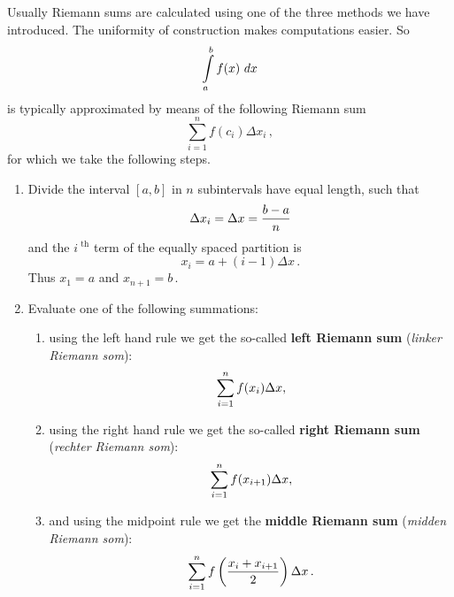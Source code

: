 Usually Riemann sums are calculated using one of the three methods we have introduced. The uniformity of construction  makes computations easier. So 
$$\ds\int\limits_a^b f(x) \ dx$$
is typically approximated by means of the following Riemann sum
$$
\sum_{i=1}^n f(c_i)\Delta x_i\,,
$$
for which we take the following steps. 
\begin{enumerate}
\item	Divide the interval $[a,b]$ in $n$ subintervals have equal length, such that
$$\displaystyle \Delta x_i = \Delta x = \frac{b-a}n$$
and the $i^\text{ th}$ term of the equally spaced partition is 
$$x_i = a + (i-1)\Delta x\,.$$ Thus $x_1=a$ and  $x_{n+1} = b\,.$

\item Evaluate one of the following summations:
\begin{enumerate}
\item		using the left hand rule we get the so-called \textbf{left Riemann sum} (\textit{linker Riemann som}):
$$\displaystyle \sum_{i=1}^n f(x_i)\Delta x,$$
\item		using the right hand rule we get the so-called \textbf{right Riemann sum} (\textit{rechter Riemann som}): 
$$\displaystyle \sum_{i=1}^n f(x_{i+1})\Delta x,$$
\item		and using the midpoint rule we get the \textbf{middle Riemann sum} (\textit{midden Riemann som}):
$$\displaystyle \sum_{i=1}^n f\left(\frac{x_i+x_{i+1}}{2}\right)\Delta x\,.$$
\end{enumerate}
\end{enumerate}







